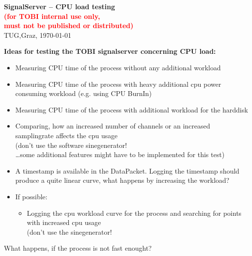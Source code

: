 \documentclass[11pt]{scrartcl}
\begin{document}
\begin{center}
\textbf{\Large{SignalServer -- CPU load testing}\\  \vspace*{0.3cm}
\textcolor{red}{(for TOBI internal use only,\\ must not be published or distributed)} }\\
\vspace*{0.2cm}
TUG,\quad Graz, \today{}
\end{center}

\vspace*{1cm}
\textbf{Ideas for testing the TOBI signalserver concerning CPU load:}\\

\begin{itemize}
  \item Measuring CPU time of the process without any additional workload
  \item Measuring CPU time of the process with heavy additional cpu power consuming workload (e.g. using CPU BurnIn)
  \item Measuring CPU time of the process with additional workload for the harddisk
  \item Comparing, how an increased number of channels or an increased samplingrate affects the cpu usage\\
        \hspace*{0.4cm}(don't use the software sinegenerator!\\
        \hspace*{0.5cm}\dots some additional features might have to be implemented for this test)
  \\
  \item A timestamp is available in the DataPacket. Logging the timestamp should produce a quite linear curve, what happens by increasing the workload?
  \\
  \item If possible:
    \begin{itemize}
      \item Logging the cpu workload curve for the process and searching for points with increased cpu usage\\
          \hspace*{0.4cm}(don't use the sinegenerator!
    \end{itemize}
\end{itemize}
\vspace*{1cm}
What happens, if the process is not fast enought?
\end{document}
